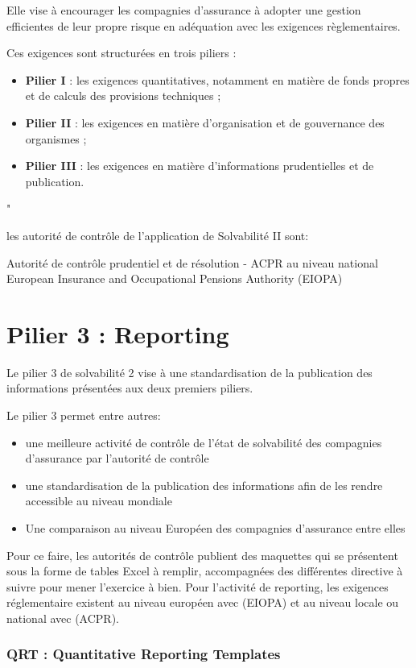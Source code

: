 Elle vise à encourager les compagnies d'assurance à adopter une gestion efficientes de leur propre risque en adéquation avec les exigences règlementaires.

Ces exigences sont structurées en trois piliers : 
\begin{itemize}
\item \textbf{Pilier I} : les exigences quantitatives, notamment en matière de fonds propres et de calculs des provisions techniques ;
\item \textbf{Pilier II} : les exigences en matière d’organisation et de gouvernance des organismes ;
\item \textbf{Pilier III} : les exigences en matière d'informations prudentielles et de publication.  
\end{itemize} 
"

les autorité de contrôle de l'application de Solvabilité II sont:

 Autorité de contrôle prudentiel et de résolution - ACPR au niveau national
 European Insurance and Occupational Pensions Authority (EIOPA)
 
\section{Pilier 3 : Reporting}

Le pilier 3 de solvabilité 2 vise à une standardisation de la publication des informations présentées aux deux premiers piliers.

Le pilier 3 permet entre autres:

\begin{itemize}
\item une meilleure activité de contrôle de l'état de solvabilité des compagnies d'assurance par l'autorité de contrôle
\item une standardisation de la publication des informations afin de les rendre accessible au niveau mondiale
\item Une comparaison au niveau Européen des compagnies d'assurance entre elles
\end{itemize}

Pour ce faire, les autorités de contrôle publient des maquettes qui se présentent sous la forme de tables Excel à remplir, accompagnées des différentes directive à suivre pour mener l’exercice à bien. Pour l'activité de reporting, les exigences réglementaire existent au niveau européen avec (EIOPA) et au niveau locale ou national avec (ACPR).

\subsubsection*{QRT : Quantitative Reporting Templates}

